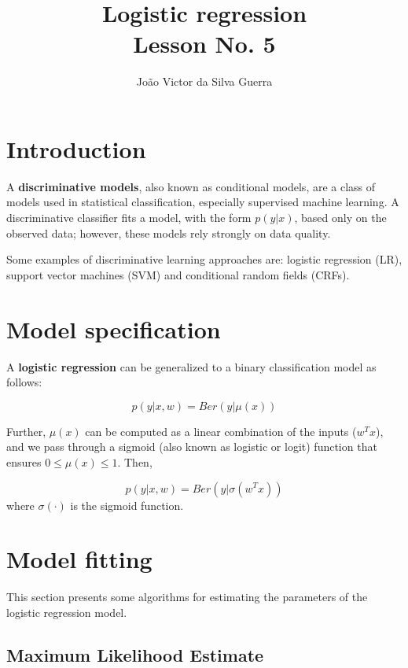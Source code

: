 \documentclass{article}
\begin{document}
\title{Logistic regression\\\normalsize Lesson No. 5}
\author{Jo\~ao Victor da Silva Guerra}

\maketitle

\section{Introduction}

A \textbf{discriminative models}, also known as conditional models, are a class of models used in statistical classification, especially supervised machine learning. A discriminative classifier fits a model, with the form $p(y|x)$, based only on the observed data; however, these models rely strongly on data quality.

Some examples of discriminative learning approaches are: logistic regression (LR), support vector machines (SVM) and conditional random fields (CRFs).

\section{Model specification}

A \textbf{logistic regression} can be generalized to a binary classification model as follows:

\begin{equation}
  p(y|x, w) = Ber(y|\mu(x))
\end{equation}

Further, $\mu(x)$ can be computed as a linear combination of the inputs ($w^Tx$), and we pass through a sigmoid (also known as logistic or logit) function that ensures $0 \leq \mu(x) \leq 1$. Then, 

\begin{equation}
  p(y|x, w) = Ber(y|\sigma(w^Tx))
\end{equation}
where $\sigma(\cdot)$ is the sigmoid function.

\section{Model fitting}

This section presents some algorithms for estimating the parameters of the logistic regression model.

\subsection{Maximum Likelihood Estimate}


\printbibliography
\end{document}
